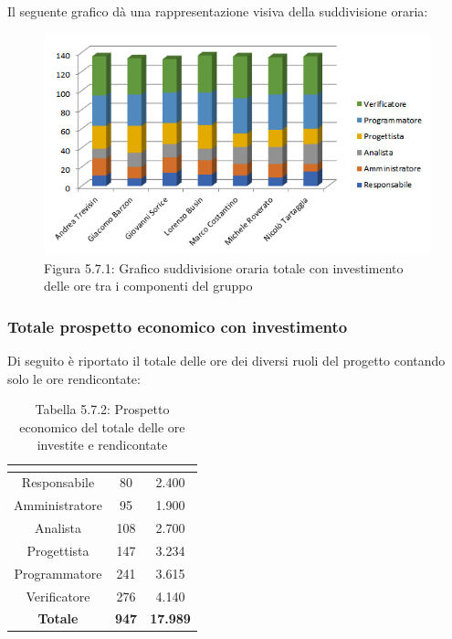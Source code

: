Il seguente grafico dà una rappresentazione visiva della suddivisione oraria: \\
\begin{figure} [H]
	\centering
	\includegraphics[scale=1]{Res/ExcelGrafici/Grafici/InvestimentoOre.png}
	\caption{Figura 5.7.1: Grafico suddivisione oraria totale con investimento delle ore tra i componenti del gruppo}\label{}
\end{figure}

\subsubsection{Totale prospetto economico con investimento}
Di seguito è riportato il totale delle ore dei diversi ruoli del progetto contando solo le ore rendicontate:

\renewcommand{\arraystretch}{1.5}
\begin{table}[H]
\begin{center}
\begin{tabular}{|c|c|c|}
\hline
\rowcolor{title_row}
\textbf{\color{title_text}{Ruolo}}  & \textbf{\color{title_text}{Ore}} & \textbf{\color{title_text}{Costo in \euro}} \\ \hline
Responsabile    & 80 & 2.400 \\ \hline
Amministratore  & 95 & 1.900 \\ \hline
Analista        & 108 & 2.700 \\ \hline
Progettista     & 147 & 3.234 \\ \hline
Programmatore   & 241 & 3.615 \\ \hline
Verificatore    & 276 & 4.140 \\ \hline
\textbf{Totale} & \textbf{947}    & \textbf{17.989}           \\ \hline
\end{tabular}
\caption{Tabella 5.7.2: Prospetto economico del totale delle ore investite e rendicontate \label{}}
\end{center}
\end{table}
\renewcommand{\arraystretch}{1}


